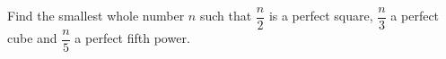 Find the smallest whole number $n$ such that $\dfrac n2$ is a perfect square, $\dfrac n3$ a perfect cube and $\dfrac n5$ a perfect fifth power.
